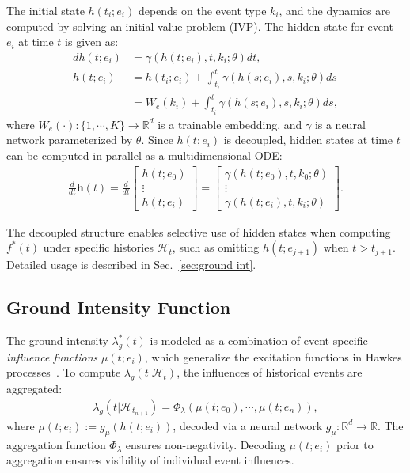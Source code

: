 The initial state $h(t_i;e_i)$ depends on the event type $k_i$, and the dynamics are computed by solving an initial value problem (IVP). The hidden state for event $e_i$ at time $t$ is given as:
\begin{align}
d h(t;e_i) &=  \gamma(h(t;e_i), t, k_i;\theta) dt, \\
h(t;e_i) &= h(t_i;e_i) + \int_{t_i}^t \gamma(h(s;e_i), s, k_i;\theta) ds \nonumber \\
&= W_{e}(k_i) + \int_{t_i}^t \gamma(h(s;e_i), s, k_i;\theta) ds,
\label{eq:hiddenS}
\end{align}
where $W_e(\cdot): \{1, \cdots, K\} \rightarrow \mathbb{R}^d$ is a trainable embedding, and $\gamma$ is a neural network parameterized by $\theta$. Since $h(t;e_i)$ is decoupled, hidden states at time $t$ can be computed in parallel as a multidimensional ODE:
\begin{align}
    \frac{d}{dt} \mathbf{h}(t) = 
    \frac{d}{dt}
    \begin{bmatrix}
        h(t;e_0) \\
        \vdots \\ 
        h(t;e_i)
    \end{bmatrix}
    = 
    \begin{bmatrix}
        \gamma(h(t;e_0), t, k_0;\theta) \\ 
        \vdots \\ 
        \gamma(h(t;e_i), t, k_i;\theta)
    \end{bmatrix}.
    \label{eq:hidden_parallel}
\end{align}

The decoupled structure enables selective use of hidden states when computing $f^*(t)$ under specific histories $\mathcal{H}_t$, such as omitting $h(t;e_{j+1})$ when $t > t_{j+1}$. Detailed usage is described in Sec.~\ref{sec:ground int}.

\subsection{Ground Intensity Function \label{sec:ground int}}

The ground intensity $\lambda^*_g(t)$ is modeled as a combination of event-specific \textit{influence functions} $\mu(t;e_i)$, which generalize the excitation functions in Hawkes processes~\cite{bib:hawkes}. To compute $\lambda_g(t|\mathcal{H}_t)$, the influences of historical events are aggregated:
\begin{align}
    \lambda_g(t|\mathcal{H}_{t_{n+1}}) = \Phi_\lambda(\mu(t;e_0), \cdots, \mu(t;e_n)),
    \label{eq:lambdag}
\end{align}
where $\mu(t;e_i) := g_\mu(h(t;e_i))$, decoded via a neural network $g_\mu: \mathbb{R}^d \rightarrow \mathbb{R}$. The aggregation function $\Phi_\lambda$ ensures non-negativity. Decoding $\mu(t;e_i)$ prior to aggregation ensures visibility of individual event influences.

